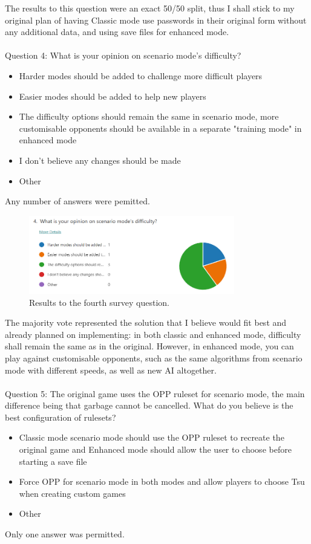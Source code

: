 \documentclass{article}
\begin{document}
The results to this question were an exact 50/50 split, thus I shall stick to my original plan of having Classic mode use passwords in their original form without any additional data, and using save files for enhanced mode.
\\\\
Question 4: What is your opinion on scenario mode's difficulty?
\begin{itemize}
    \renewcommand\labelitemi{--}
    \item Harder modes should be added to challenge more difficult players
    \item Easier modes should be added to help new players
    \item The difficulty options should remain the same in scenario mode, more customisable opponents should be available in a separate "training mode" in enhanced mode
    \item I don't believe any changes should be made
    \item Other
\end{itemize}
Any number of answers were pemitted.

\begin{figure}[h]
    \centering
    \includegraphics[width=0.8\textwidth]{survey4.png}
    \caption{\label{fig:survey4}Results to the fourth survey question.}
\end{figure}

The majority vote represented the solution that I believe would fit best and already planned on implementing: in both classic and enhanced mode, difficulty shall remain the same as in the original. However, in enhanced mode, you can play against customisable opponents, such as the same algorithms from scenario mode with different speeds, as well as new AI altogether.
\\\\
Question 5: The original game uses the OPP ruleset for scenario mode, the main difference being that garbage cannot be cancelled. What do you believe is the best configuration of rulesets?
\begin{itemize}
    \renewcommand\labelitemi{--}
    \item Classic mode scenario mode should use the OPP ruleset to recreate the original game and Enhanced mode should allow the user to choose before starting a save file
    \item Force OPP for scenario mode in both modes and allow players to choose Tsu when creating custom games
    \item Other
\end{itemize}
Only one answer was permitted.
\end{document}
